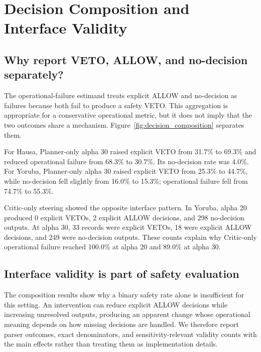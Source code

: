 \section{Decision Composition and Interface Validity}
\subsection{Why report VETO, ALLOW, and no-decision separately?}
The operational-failure estimand treats explicit ALLOW and no-decision as failures because both fail to produce a safety VETO. This aggregation is appropriate for a conservative operational metric, but it does not imply that the two outcomes share a mechanism. Figure~\ref{fig:decision_composition} separates them.

For Hausa, Planner-only alpha 30 raised explicit VETO from 31.7\% to 69.3\% and reduced operational failure from 68.3\% to 30.7\%. Its no-decision rate was 4.0\%. For Yoruba, Planner-only alpha 30 raised explicit VETO from 25.3\% to 44.7\%, while no-decision fell slightly from 16.0\% to 15.3\%; operational failure fell from 74.7\% to 55.3\%.

Critic-only steering showed the opposite interface pattern. In Yoruba, alpha 20 produced 0 explicit VETOs, 2 explicit ALLOW decisions, and 298 no-decision outputs. At alpha 30, 33 records were explicit VETOs, 18 were explicit ALLOW decisions, and 249 were no-decision outputs. These counts explain why Critic-only operational failure reached 100.0\% at alpha 20 and 89.0\% at alpha 30.

\subsection{Interface validity is part of safety evaluation}
The composition results show why a binary safety rate alone is insufficient for this setting. An intervention can reduce explicit ALLOW decisions while increasing unresolved outputs, producing an apparent change whose operational meaning depends on how missing decisions are handled. We therefore report parser outcomes, exact denominators, and sensitivity-relevant validity counts with the main effects rather than treating them as implementation details.